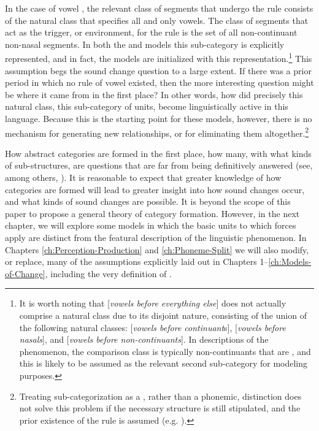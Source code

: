 In the case of vowel , the relevant class of segments that
undergo the rule consists of the natural class that specifies all
and only vowels. The class of segments that act as the trigger, or
environment, for the rule is the set of all non-continuant non-nasal
 segments. In both the  and  models
this sub-category is explicitly represented, and in fact, the models
are initialized with this representation.\footnote{It is worth noting that {[}\emph{vowels before everything else}{]}
does not actually comprise a natural class due to its disjoint nature,
consisting of the union of the following natural classes: {[}\emph{vowels
before continuant}s{]}, {[}\emph{vowels before nasals}{]}, and {[}\emph{vowels
before  non-continuants}{]}. In descriptions of the phenomenon,
the comparison class is typically non-continuants that are ,
and this is likely to be assumed as the relevant second sub-category
for modeling purposes.} This assumption begs the sound change question to a large extent.
If there was a prior period in which no rule of vowel 
existed, then the more interesting question might be where it came
from in the first place? In other words, how did precisely this natural
class, this sub-category of  units, become linguistically
active in this language. Because this is the starting point for
these models, however, there is no mechanism for generating new 
relationships, or for eliminating them altogether.\footnote{Treating sub-categorization as a , rather than a phonemic,
distinction does not solve this problem if the necessary structure
is still stipulated, and the prior existence of the  rule
is assumed (e.g. \citealp{dillon2013single}).}

How abstract categories are formed in the first place, how many,
with what kinds of sub-structures, are questions that are far from
being definitively answered (see, among others, \citealt{Peperkamp2006,dillon2013single,feldman2009learning,mcmurray2011information,goldsmith2009learning}).
It is reasonable to expect that greater knowledge of how categories
are formed will lead to greater insight into how sound changes occur,
and what kinds of sound changes are possible. It is beyond the scope
of this paper to propose a general theory of category formation. However,
in the next chapter, we will explore some models in which the basic
units to which forces apply are distinct from the featural description
of the linguistic phenomenon. In Chapters \ref{ch:Perception-Production}
and \ref{ch:Phoneme-Split} we will also modify, or replace, many
of the assumptions explicitly laid out in Chapters 1--\ref{ch:Models-of-Change},
including the very definition of .
